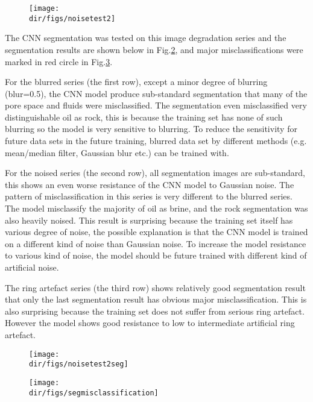 \begin{figure}[htbp]
  \centering
  \texttt{[image: \\dir/figs/noisetest2]}
  \caption{}
  \label{noisetest}
\end{figure}

The CNN segmentation was tested on this image degradation series and the segmentation results are shown below in Fig.\ref{noisetestseg}, and major misclassifications were marked in red circle in Fig.\ref{segmisclassification}.  

For the blurred series (the first row), except a minor degree of blurring (blur=0.5), the CNN model produce sub-standard segmentation that many of the pore space and fluids were misclassified. The segmentation even misclassified very distinguishable oil as rock, this is because the training set has none of such blurring so the model is very sensitive to blurring. To reduce the sensitivity for future data sets in the future training, blurred data set by different methods (e.g. mean/median filter, Gaussian blur etc.) can be trained with.

For the noised series (the second row), all segmentation images are sub-standard, this shows an even worse resistance of the CNN model to Gaussian noise. The pattern of misclassification in this series is very different to the blurred series. The model misclassify the majority of oil as brine, and the rock segmentation was also heavily noised. This result is surprising because the training set itself has various degree of noise, the possible explanation is that the CNN model is trained on a different kind of noise than Gaussian noise. To increase the model resistance to various kind of noise, the model should be future trained with different kind of artificial noise. 

The ring artefact series (the third row) shows relatively good segmentation result that only the last segmentation result has obvious major misclassification. This is also surprising because the training set does not suffer from serious ring artefact. However the model shows good resistance to low to intermediate artificial ring artefact.

\begin{figure}[htbp]
  \centering
  \texttt{[image: \\dir/figs/noisetest2seg]}
  \caption{}
  \label{noisetestseg}
\end{figure}

\begin{figure}[htbp]
  \centering
  \texttt{[image: \\dir/figs/segmisclassification]}
  \caption{}
  \label{segmisclassification}
\end{figure}

